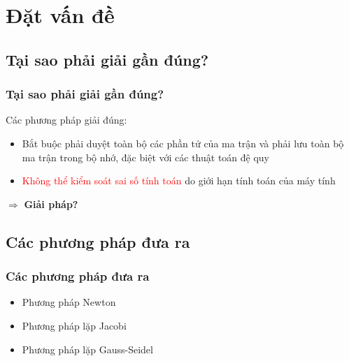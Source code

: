 \section{Đặt vấn đề}
    \subsection{Tại sao phải giải gần đúng?}
    \begin{frame}
        \frametitle{Tại sao phải giải gần đúng?}

        \par Các phương pháp giải đúng:
        \begin{itemize}
            \item Bắt buộc phải duyệt toàn bộ các phần tử của ma trận và phải lưu toàn bộ ma trận trong bộ nhớ, đặc biệt với các thuật toán đệ quy
            \item \textcolor{red}{Không thể kiểm soát sai số tính toán} do giới hạn tính toán của máy tính
        \end{itemize}

        \par $ \Rightarrow $ \textbf{Giải pháp?}
    \end{frame}

    \subsection{Các phương pháp đưa ra}
    \begin{frame}
        \frametitle{Các phương pháp đưa ra}
        \begin{itemize}
            \item Phương pháp Newton
            \item Phương pháp lặp Jacobi
            \item Phương pháp lặp Gauss-Seidel
        \end{itemize}
    \end{frame}

    